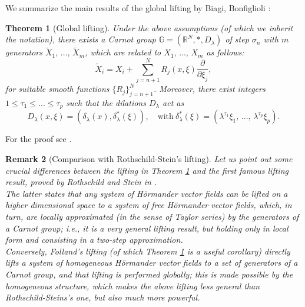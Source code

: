 \documentclass{article}
\newtheorem{theorem}{Theorem}[section]
\newtheorem{remark}[theorem]{Remark}
\numberwithin{equation}{section}
\begin{document}
\vspace{2mm}

\hspace{-7mm} We summarize the main results of the global lifting by Biagi, Bonfiglioli \cite{lifting BB}:

\vspace{2mm}

\begin{theorem}[Global lifting]
\label{global BB lifting thm}
    Under the above assumptions (of which we inherit the notation), there exists a Carnot group $\mathbb{G}=(\mathbb{R}^N, *, D_{\lambda})$ of step $\sigma_n$ with $m$ generators $\widetilde{X}_1, \, ..., \, \widetilde{X}_m$, which are related to $X_1, \, ..., \, X_m$ as follows:
\begin{equation}
\label{relation X_i tilde and X_i}
    \widetilde{X}_i = X_i + \sum_{j=n+1}^N R_j(x,\xi) \frac{\partial}{\partial \xi_j},
\end{equation}
for suitable smooth functions $\{R_j\}_{j=n+1}^N$. Moreover, there exist integers $1 \leq \tau_1 \leq ... \leq \tau_p$ such that the  dilations $D_{\lambda}$ act as
\begin{equation*}
    D_{\lambda}(x,\xi)=(\delta_{\lambda}(x), \delta_{\lambda}^*(\xi)), \quad \text{with} \: \delta_{\lambda}^*(\xi)=(\lambda^{\tau_1} \xi_1, \, ..., \, \lambda^{\tau_p} \xi_p).
\end{equation*}
\end{theorem}

\vspace{2mm}

\hspace{-7mm} For the proof see \cite[Theorem 3.2]{lifting BB}.

\vspace{2mm}

\begin{remark}[Comparison with Rothschild-Stein's lifting]
    Let us point out some crucial differences between the lifting in Theorem \ref{global BB lifting thm} and the first famous lifting result, proved by Rothschild and Stein in \cite{R.S. lifting}. \\The latter states that \emph{any} system of Hörmander vector fields can be lifted on a higher dimensional space to a system of free Hörmander vector fields, which, in turn, are locally approximated (in the sense of Taylor series) by the generators of a Carnot group; i.e., it is a very general lifting result, but holding only in local form and consisting in a two-step approximation. \\Conversely, Folland's lifting (of which Theorem \ref{global BB lifting thm} is a useful corollary) directly lifts a system of homogeneous Hörmander vector fields to a set of generators of a Carnot group, and that lifting is performed globally; this is made possible by the homogeneous structure, which makes the above lifting less general than Rothschild-Steins's one, but also much more powerful.
    \end{remark}
\end{document}
